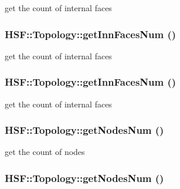 get the count of internal faces \hypertarget{classHSF_1_1Topology_a7b260fdf67cfe1290b8302fa46b79e70}{
\subsubsection[{getInnFacesNum}]{ HSF::Topology::getInnFacesNum ()}}
\label{classHSF_1_1Topology_a7b260fdf67cfe1290b8302fa46b79e70}


get the count of internal faces \hypertarget{classHSF_1_1Topology_a7b260fdf67cfe1290b8302fa46b79e70}{
\subsubsection[{getInnFacesNum}]{ HSF::Topology::getInnFacesNum ()}}
\label{classHSF_1_1Topology_a7b260fdf67cfe1290b8302fa46b79e70}


get the count of internal faces \hypertarget{classHSF_1_1Topology_a9a62513cf2963da4ab2bf58d46d6d9f7}{
\subsubsection[{getNodesNum}]{ HSF::Topology::getNodesNum ()}}
\label{classHSF_1_1Topology_a9a62513cf2963da4ab2bf58d46d6d9f7}


get the count of nodes \hypertarget{classHSF_1_1Topology_a9a62513cf2963da4ab2bf58d46d6d9f7}{
\subsubsection[{getNodesNum}]{ HSF::Topology::getNodesNum ()}}
\label{classHSF_1_1Topology_a9a62513cf2963da4ab2bf58d46d6d9f7}


